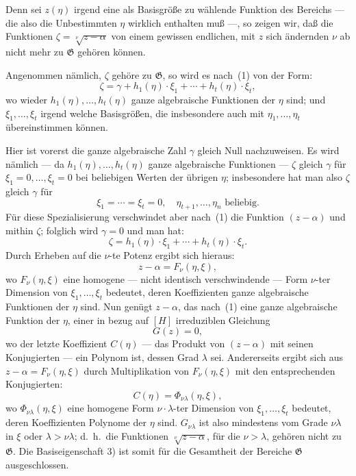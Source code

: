 \documentclass[12pt,a4paper]{article}
\begin{document}
Denn sei $z(\eta)$ irgend eine als Basisgr\"o\ss e zu w\"ahlende Funktion des Bereichs --- die also die Unbestimmten $\eta$ wirklich enthalten mu\ss{} ---, so zeigen wir, da\ss{} die Funktionen $\zeta = \sqrt[\nu]{z - \alpha}$ von einem gewissen endlichen, mit $z$ sich \"andernden $\nu$ ab nicht mehr zu $\mathfrak{G}$ geh\"oren k\"onnen.

Angenommen n\"amlich, $\zeta$ geh\"ore zu $\mathfrak{G}$, so wird es nach~(1) von der Form:
\[\zeta = \gamma + h_1(\eta) \cdot \xi_1 + \cdots + h_t(\eta) \cdot \xi_t,\]
wo wieder $h_1(\eta), \ldots, h_t(\eta)$ ganze algebraische Funktionen der $\eta$ sind; und $\xi_1, \ldots, \xi_t$ irgend welche Basisgr\"o\ss en, die insbesondere auch mit $\eta_1, \ldots, \eta_t$ \"ubereinstimmen k\"onnen.

Hier ist vorerst die ganze algebraische Zahl $\gamma$ gleich Null nachzuweisen. Es wird n\"amlich --- da $h_1(\eta), \ldots, h_t(\eta)$ ganze algebraische Funktionen --- $\zeta$ gleich $\gamma$ f\"ur $\xi_1 = 0, \ldots, \xi_t = 0$ bei beliebigen Werten der \"ubrigen $\eta$; insbesondere hat man also $\zeta$ gleich $\gamma$ f\"ur
\[\xi_1 = \cdots = \xi_t = 0, \quad \eta_{t+1}, \ldots, \eta_n \text{ beliebig}.\]
F\"ur diese Spezialisierung verschwindet aber nach~(1) die Funktion $(z - \alpha)$ und mithin $\zeta$; folglich wird $\gamma = 0$ und man hat:
\[\zeta = h_1(\eta) \cdot \xi_1 + \cdots + h_t(\eta) \cdot \xi_t.\]
Durch Erheben auf die $\nu$-te Potenz ergibt sich hieraus:
\[z - \alpha = F_{\nu}(\eta, \xi),\]
wo $F_{\nu}(\eta, \xi)$ eine homogene --- nicht identisch verschwindende --- Form $\nu$-ter Dimension von $\xi_1, \ldots, \xi_t$ bedeutet, deren Koeffizienten ganze algebraische Funktionen der $\eta$ sind. Nun gen\"ugt $z - \alpha$, das nach~(1) eine ganze algebraische Funktion der $\eta$, einer in bezug auf $[H]$ irreduziblen Gleichung
\[G(z) = 0,\]
wo der letzte Koeffizient $C(\eta)$ --- das Produkt von $(z - \alpha)$ mit seinen Konjugierten --- ein Polynom ist, dessen Grad $\lambda$ sei. Andererseits ergibt sich aus $z - \alpha = F_{\nu}(\eta, \xi)$ durch Multiplikation von $F_{\nu}(\eta, \xi)$ mit den entsprechenden Konjugierten:
\[C(\eta) = \Phi_{\nu\lambda}(\eta, \xi),\]
wo $\Phi_{\nu\lambda}(\eta, \xi)$ eine homogene Form $\nu \cdot \lambda$-ter Dimension von $\xi_1, \ldots, \xi_t$ bedeutet, deren Koeffizienten Polynome der $\eta$ sind. $G_{\nu\lambda}$ ist also mindestens vom Grade $\nu\lambda$ in $\xi$ oder $\lambda > \nu\lambda$; d.\ h.\ die Funktionen $\sqrt[\nu]{z - \alpha}$, f\"ur die $\nu > \lambda$, geh\"oren nicht zu $\mathfrak{G}$. Die Basiseigenschaft 3) ist somit f\"ur die Gesamtheit der Bereiche $\mathfrak{G}$ ausgeschlossen.
\end{document}

